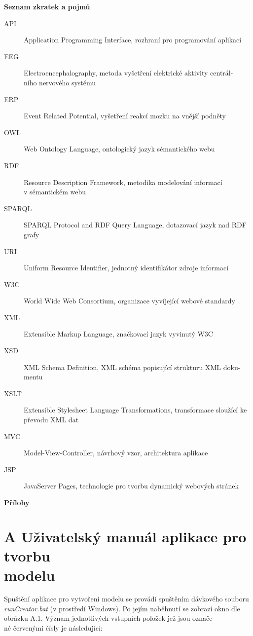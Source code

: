 \documentclass{projekt}
\begin{document}
\newpage
\thispagestyle{plain}
\noindent
{\bf \LARGE Seznam zkratek a pojmů}\\

\noindent
\begin{description}
\item[API] Application Programming Interface, rozhraní pro programování aplikací
\item[EEG] Electroencephalography, metoda vyšetření elektrické aktivity centrál-\\ního nervového
systému
\item[ERP] Event Related Potential, vyšetření reakcí mozku na vnější podněty
\item[OWL] Web Ontology Language, ontologický jazyk sémantického webu
\item[RDF] Resource Description Framework, metodika modelování informací \\v sémantickém webu
\item[SPARQL] SPARQL Protocol and RDF Query Language, dotazovací jazyk nad RDF grafy
\item[URI] Uniform Resource Identifier, jednotný identifikátor zdroje informací
\item[W3C] World Wide Web Consortium, organizace vyvíjející webové standardy
\item[XML] Extensible Markup Language, značkovací jazyk vyvinutý W3C
\item[XSD] XML Schema Definition, XML schéma popisující strukturu XML doku-\\mentu
\item[XSLT] Extensible Stylesheet Language Transformations, transformace sloužící ke převodu XML dat
\item[MVC] Model-View-Controller, návrhový vzor, architektura aplikace
\item[JSP] JavaServer Pages, technologie pro tvorbu dynamický webových stránek
\end{description}






\appendix
\newpage


\thispagestyle{plain}

\noindent
{\bf \LARGE Přílohy}
\setcounter{chapter}{1}

\newpage
\thispagestyle{plain}
\section*{{\LARGE A} Uživatelský manuál aplikace pro tvorbu \\modelu}
\hspace{0.65cm}Spuštění aplikace pro vytvoření modelu se provádí spuštěním dávkového souboru {\it runCreator.bat} (v prostředí Windows). Po jejím naběhnutí se zobrazí okno dle obrázku A.1. Význam jednotlivých vstupních položek jež jsou označe-\\né červenými čísly je následující:
\end{document}
